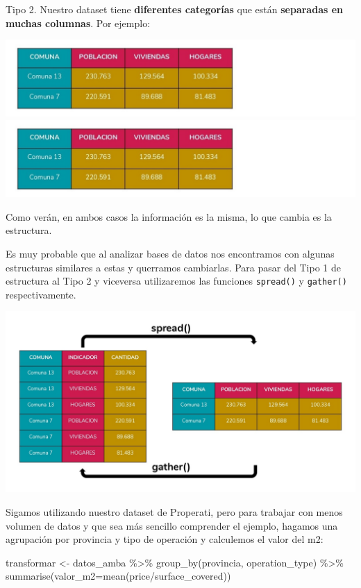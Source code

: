 \documentclass[
  spanish,
]{book}
\newenvironment{Shaded}{\begin{snugshade}}{\end{snugshade}}
\newcommand{\AttributeTok}[1]{\textcolor[rgb]{0.77,0.63,0.00}{#1}}
\newcommand{\FunctionTok}[1]{\textcolor[rgb]{0.00,0.00,0.00}{#1}}
\newcommand{\NormalTok}[1]{#1}
\newcommand{\OtherTok}[1]{\textcolor[rgb]{0.56,0.35,0.01}{#1}}
\newcommand{\SpecialCharTok}[1]{\textcolor[rgb]{0.00,0.00,0.00}{#1}}
\begin{document}
Tipo 2. Nuestro dataset tiene \textbf{diferentes categorías} que están \textbf{separadas en muchas columnas}. Por ejemplo:

\includegraphics{images/opcion1.jpg}
\includegraphics{images/opcion1.jpg}

Como verán, en ambos casos la información es la misma, lo que cambia es la estructura.

Es muy probable que al analizar bases de datos nos encontramos con algunas estructuras similares a estas y querramos cambiarlas. Para pasar del Tipo 1 de estructura al Tipo 2 y viceversa utilizaremos las funciones \texttt{spread()} y \texttt{gather()} respectivamente.

\includegraphics{images/spread_gather.jpg}

Sigamos utilizando nuestro dataset de Properati, pero para trabajar con menos volumen de datos y que sea más sencillo comprender el ejemplo, hagamos una agrupación por provincia y tipo de operación y calculemos el valor del m2:

\begin{Shaded}
\begin{Highlighting}[]
\NormalTok{transformar }\OtherTok{\textless{}{-}}\NormalTok{ datos\_amba }\SpecialCharTok{\%\textgreater{}\%}
  \FunctionTok{group\_by}\NormalTok{(provincia, operation\_type) }\SpecialCharTok{\%\textgreater{}\%}
  \FunctionTok{summarise}\NormalTok{(}\AttributeTok{valor\_m2=}\FunctionTok{mean}\NormalTok{(price}\SpecialCharTok{/}\NormalTok{surface\_covered))}
\end{Highlighting}
\end{Shaded}
\end{document}
